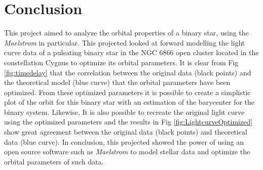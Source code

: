 \documentclass[]{article}
\begin{document}
\section{Conclusion}
This project aimed to analyze the orbital properties of a binary star, using the \textit{Maelstrom} in particular. This projected looked at forward modelling the light curve data of a pulsating binary star in the NGC 6866 open cluster located in the constellation Cygnus to optimize its orbital parameters. It is clear from Fig \ref{fig:timedelay} that the correlation between the original data (black points) and the theoretical model (blue curve) that the orbital parameters have been optimized. From these optimized parameters it is possible to create a simplistic plot of the orbit for this binary star with an estimation of the barycenter for the binary system. Likewise, It is also possible to recreate the original light curve using the optimized parameters and the results in Fig \ref{fig:LightcurveOptimized} show great agreement between the original data (black points) and theoretical data (blue curve). In conclusion, this projected showed the power of using an open source software such as \textit{Maelstrom} to model stellar data and optimize the orbital parameters of such data.

        
\end{document}
